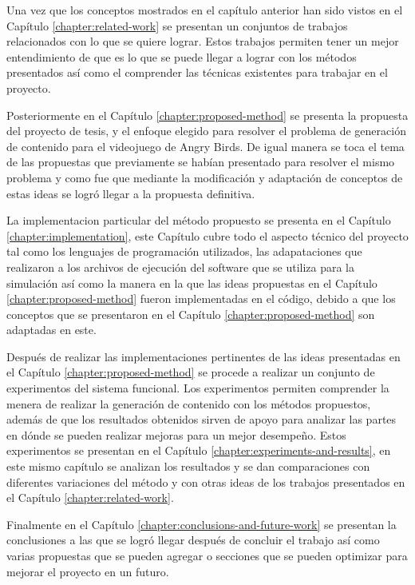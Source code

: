 Una vez que los conceptos mostrados en el capítulo anterior han sido
vistos en el Capítulo \ref{chapter:related-work} se presentan un
conjuntos de trabajos relacionados con lo que se quiere lograr. Estos trabajos
permiten tener un mejor entendimiento de que es lo que se puede llegar a lograr
con los métodos presentados así como el comprender las técnicas 
existentes para trabajar en el proyecto.

Posteriormente en el Capítulo \ref{chapter:proposed-method} se presenta la
propuesta del proyecto de tesis, y el enfoque elegido para resolver el 
problema de generación de contenido para el
videojuego de Angry Birds. De igual manera se toca el tema de las 
propuestas que previamente se habían presentado para resolver el mismo 
problema y como fue que mediante la modificación y adaptación de conceptos
de estas ideas se logró llegar a la propuesta definitiva.

La implementacion particular del método propuesto se presenta en el Capítulo
\ref{chapter:implementation}, este Capítulo cubre todo el aspecto técnico del
proyecto tal como los lenguajes de programación utilizados, las adapataciones
que realizaron a los archivos de ejecución del software que se utiliza para la
simulación así como la manera en la que las ideas propuestas en el Capítulo
\ref{chapter:proposed-method} fueron implementadas en el código, debido a que
los conceptos que se presentaron en el Capítulo \ref{chapter:proposed-method}
son adaptadas en este.

Después de realizar las implementaciones pertinentes de las ideas presentadas en
el Capítulo \ref{chapter:proposed-method} se procede a realizar un conjunto de
experimentos del sistema funcional. Los experimentos permiten comprender la
menera de realizar la generación de contenido con los métodos
propuestos, además de que los resultados obtenidos sirven de apoyo para analizar
las partes en dónde se pueden realizar mejoras para un mejor desempeño. Estos
experimentos se presentan en el Capítulo \ref{chapter:experiments-and-results},
en este mismo capítulo se analizan los resultados y se dan comparaciones con
diferentes variaciones del método y con otras ideas de los trabajos presentados
en el Capítulo \ref{chapter:related-work}.

Finalmente en el Capítulo \ref{chapter:conclusions-and-future-work} se presentan
la conclusiones a las que se logró llegar después de concluir el trabajo así
como varias propuestas que se pueden agregar o secciones que se pueden optimizar
para mejorar el proyecto en un futuro.

